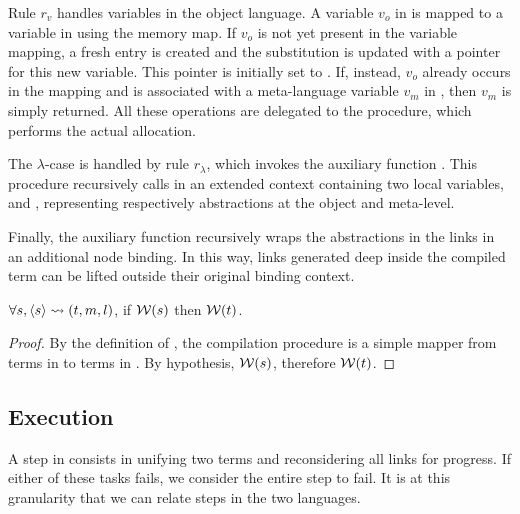 Rule $r_v$ handles variables in the object language. A variable $v_o$
in \Fo is mapped to a variable in \Ho using the memory map. If $v_o$ is
not yet present in the variable mapping, a fresh entry is created and
the substitution is updated with a pointer for this new variable. This
pointer is initially set to .
If, instead, $v_o$ already occurs in the mapping and is associated with
a meta-language variable $v_m$ in \Ho, then $v_m$ is simply returned.
All these operations are delegated to the  procedure, which
performs the actual allocation.

The $\lambda$-case is handled by rule $r_\lambda$, which invokes the
auxiliary function . This procedure recursively calls
 in an extended context containing two local variables,
 and , representing respectively abstractions at the
object and meta-level.

Finally, the auxiliary function  recursively wraps the
abstractions in the links in an additional  node binding. In this way,
links generated deep inside the compiled term can be lifted outside
their original binding context.

\begin{lemma}\label{lem:w-enforcement-pf}
  $\forall s, \langle s \rangle\rightsquigarrow(t,m,l)$, if $\mathcal{W}(s)$  then $\mathcal{W}(t)$.
\end{lemma}

\begin{proof}
  By the definition of , the compilation procedure is a simple mapper
  from terms in \Fo to terms in \Ho. By hypothesis, $\mathcal{W}(s)$, therefore
  $\mathcal{W}(t)$.
\end{proof}


\subsection{Execution}
\label{sec:execution}

A step in \Ho consists in unifying two terms and reconsidering all
links for progress. If either of these tasks fails, we consider the entire step to
fail. It is at this granularity that we can relate steps in the
two languages.





